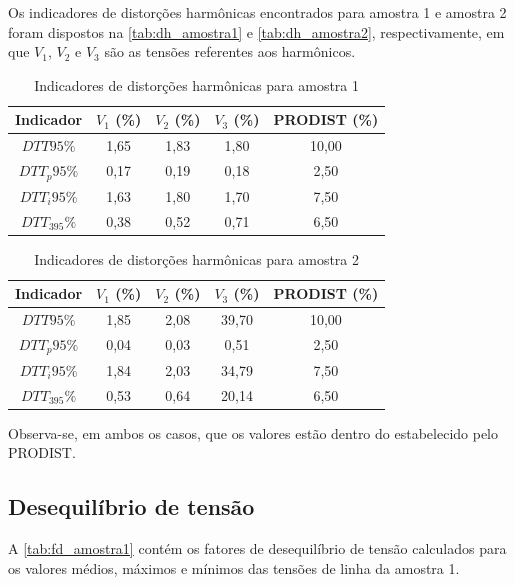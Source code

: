 Os indicadores de distorções harmônicas encontrados para amostra 1 e amostra 2 foram dispostos na \autoref{tab:dh_amostra1} e \autoref{tab:dh_amostra2}, respectivamente, em que $V_1$, $V_2$ e $V_3$ são as tensões referentes aos harmônicos.

\begin{table}[H]
  \centering
  \caption{Indicadores de distorções harmônicas para amostra 1}
  \label{tab:dh_amostra1}
  \begin{tabular}{@{}ccccc@{}}
    \toprule
    \textbf{Indicador} & \textbf{$V_1$ (\%)} & \textbf{$V_2$ (\%)} & \textbf{$V_3$ (\%)} & \textbf{PRODIST  (\%)} \\
    \midrule
    $DTT95\%$   & 1,65 & 1,83 & 1,80 & 10,00 \\
    $DTT_p95\%$ & 0,17 & 0,19 & 0,18 & 2,50 \\
    $DTT_i95\%$ & 1,63 & 1,80 & 1,70 & 7,50 \\
    $DTT_395\%$ & 0,38 & 0,52 & 0,71 & 6,50 \\
    \bottomrule
  \end{tabular}
\end{table}

\begin{table}[H]
  \centering
  \caption{Indicadores de distorções harmônicas para amostra 2}
  \label{tab:dh_amostra2}
  \begin{tabular}{@{}ccccc@{}}
    \toprule
    \textbf{Indicador} & \textbf{$V_1$ (\%)} & \textbf{$V_2$ (\%)} & \textbf{$V_3$ (\%)} & \textbf{PRODIST  (\%)} \\
    \midrule
    $DTT95\%$   & 1,85 & 2,08 & 39,70 & 10,00 \\
    $DTT_p95\%$ & 0,04 & 0,03 & 0,51 & 2,50 \\
    $DTT_i95\%$ & 1,84 & 2,03 & 34,79 & 7,50 \\
    $DTT_395\%$ & 0,53 & 0,64 & 20,14 & 6,50 \\
    \bottomrule
  \end{tabular}
\end{table}

Observa-se, em ambos os casos, que os valores estão dentro do estabelecido pelo PRODIST.

\subsection{Desequilíbrio de tensão}

A \autoref{tab:fd_amostra1} contém os fatores de desequilíbrio de tensão calculados para os valores médios, máximos e mínimos das tensões de linha da amostra 1.

